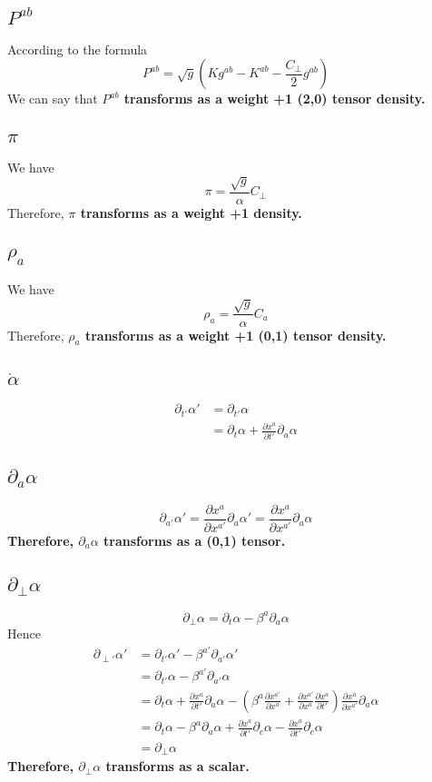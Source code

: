 \documentclass{article}
\begin{document}
\subsection{$P^{ab}$}
According to the formula
\[
P^{ab} = \sqrt{g}(Kg^{ab} - K^{ab} - \frac{C_{\perp}}{2}g^{ab})
\]
We can say that {\bf {\color{red}$P^{ab}$ transforms as a weight +1 (2,0) tensor density.}}
\subsection{$\pi$}
We have
\[
\pi = \frac{\sqrt{g}}{\alpha}C_{\perp}
\]
Therefore, {\bf {\color{red}$\pi$ transforms as a weight +1 density.}}
\subsection{$\rho_{a}$}
We have
\[
\rho_{a} = \frac{\sqrt{g}}{\alpha}C_{a}
\]
Therefore, {\bf {\color{red}$\rho_{a}$ transforms as a weight +1 (0,1) tensor density.}}
\subsection{${\dot \alpha}$}
\begin{align*}
\partial_{t'}\alpha' & = \partial_{t'}\alpha\\
& = \partial_{t}\alpha + \frac{\partial x^{a}}{\partial t'}\partial_{a}\alpha
\end{align*} 
\subsection{$\partial_{a}\alpha$}
\[
\boxed{
\partial_{a'}\alpha' = \frac{\partial x^{a}}{\partial x^{a'}}\partial_{a}\alpha' = \frac{\partial x^{a}}{\partial x^{a'}}\partial_{a}\alpha
}
\]
{\bf {\color{red}Therefore, $\partial_{a}\alpha$ transforms as a (0,1) tensor.}}
\subsection{$\partial_{\perp}\alpha$}
\[
\partial_{\perp}\alpha = \partial_{t}\alpha - \beta^{a}\partial_{a}\alpha
\]
Hence
\begin{align*}
\partial_{\perp'}\alpha' & = \partial_{t'}\alpha' - \beta^{a'}\partial_{a'}\alpha'\\
& = \partial_{t'}\alpha - \beta^{a'}\partial_{a'}\alpha\\
& = \partial_{t}\alpha + \frac{\partial x^{a}}{\partial t'}\partial_{a}\alpha - (\beta^{a}\frac{\partial x^{a'}}{\partial x^{a}} + \frac{\partial x^{a'}}{\partial x^{a}}\frac{\partial x^{a}}{\partial t'})\frac{\partial x^{a}}{\partial x^{a'}}\partial_{a}\alpha\\
& = \partial_{t}\alpha - \beta^{a}\partial_{a}\alpha + \frac{\partial x^{a}}{\partial t'}\partial_{c}\alpha -  \frac{\partial x^{a}}{\partial t'}\partial_{c}\alpha\\
& = \partial_{\perp}\alpha
\end{align*}
{\bf {\color{red}Therefore, $\partial_{\perp}\alpha$ transforms as a scalar. }}
\end{document}
